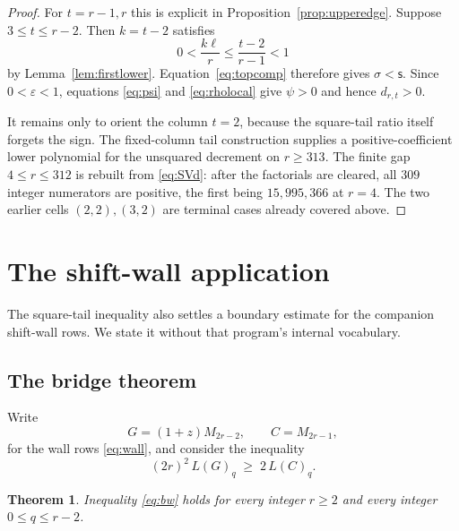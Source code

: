 \documentclass[11pt,a4paper]{article}
\theoremstyle{plain}
\newtheorem{theorem}{Theorem}[section]
\theoremstyle{definition}
\theoremstyle{remark}
\newcommand{\ls}{\mathsf{s}}
\begin{document}
\begin{proof}
For $t=r-1,r$ this is explicit in Proposition~\ref{prop:upperedge}. Suppose
$3\le t\le r-2$. Then $k=t-2$ satisfies
\[
  0<\frac{k\ell}{r}\le\frac{t-2}{r-1}<1
\]
by Lemma~\ref{lem:firstlower}. Equation~\eqref{eq:topcomp} therefore gives
$\sigma<\ls$. Since $0<\varepsilon<1$, equations \eqref{eq:psi} and
\eqref{eq:rholocal} give $\psi>0$ and hence $d_{r,t}>0$.

It remains only to orient the column $t=2$, because the square-tail ratio itself
forgets the sign. The fixed-column tail construction supplies a
positive-coefficient lower polynomial for the unsquared decrement on
$r\ge313$. The finite gap $4\le r\le312$ is rebuilt from \eqref{eq:SVd}:
after the factorials are cleared, all $309$ integer numerators are positive,
the first being $15{,}995{,}366$ at $r=4$. The two earlier cells
$(2,2),(3,2)$ are terminal cases already covered above.
\end{proof}

\section{The shift-wall application}\label{sec:bridge}

The square-tail inequality also settles a boundary estimate for the companion
shift-wall rows. We state it without that program's internal vocabulary.

\subsection{The bridge theorem}

Write
\[
  G=(1+z)M_{2r-2},\qquad C=M_{2r-1},
\]
for the wall rows \eqref{eq:wall}, and consider the inequality
\begin{equation}\label{eq:bw}
  (2r)^2\,L(G)_q\;\ge\;2\,L(C)_q .
\end{equation}

\begin{theorem}\label{thm:bw}
Inequality \eqref{eq:bw} holds for every integer $r\ge2$ and every
integer $0\le q\le r-2$.
\end{theorem}
\end{document}
